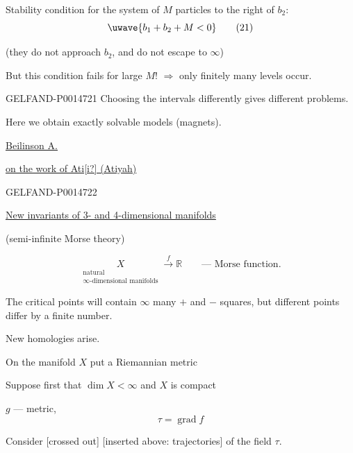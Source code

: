 Stability condition for the system of \(M\) particles to the right of \(b_2\):
\begin{equation*}
\uwave{b_1+b_2+M<0}
\tag{21}
\end{equation*}

(they do not approach \(b_2\), and do not escape to \(\infty\))

But this condition fails for large \(M\)!
\(\Longrightarrow\) only finitely many levels occur.


\begin{GelfandAdjacentEvidence}{GELFAND-P001472}{1}
Choosing the intervals differently gives different problems.

Here we obtain exactly solvable models (magnets).

\underline{\underline{Beilinson A.}}

\underline{on the work of Ati[i?] (Atiyah)}
\end{GelfandAdjacentEvidence}
\begin{GelfandAdjacentEvidence}{GELFAND-P001472}{2}


\underline{New invariants of 3- and 4-dimensional manifolds}

(semi-infinite Morse theory)

\[
\underset{\substack{\text{natural}\\\infty\text{-dimensional manifolds}}}{X}
\xrightarrow{f}\mathbb R\qquad\text{— Morse function.}
\]

The critical points will contain \(\infty\) many \(+\) and \(-\) squares, but different points differ by a finite number.

New homologies arise.

On the manifold \(X\) put a Riemannian metric

Suppose first that \(\dim X<\infty\) and \(X\) is compact

\(g\) — metric,
\[
\tau=\operatorname{grad}f
\]

Consider [crossed out] [inserted above: trajectories] of the field \(\tau\).
\end{GelfandAdjacentEvidence}
